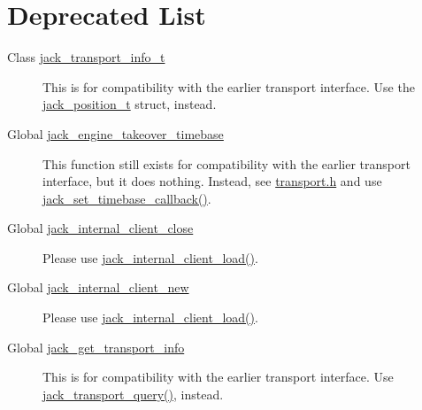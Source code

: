 \hypertarget{deprecated}{}\section{Deprecated List}\label{deprecated}
\label{deprecated__deprecated000004}
\hypertarget{deprecated__deprecated000004}{}
 \begin{description}
\item[Class \hyperlink{structjack__transport__info__t}{jack\_\-transport\_\-info\_\-t} ]This is for compatibility with the earlier transport interface. Use the \hyperlink{structjack__position__t}{jack\_\-position\_\-t} struct, instead. \end{description}


\label{deprecated__deprecated000003}
\hypertarget{deprecated__deprecated000003}{}
 \begin{description}
\item[Global \hyperlink{jack_8h_fe90d892429267872e213823cbed0d84}{jack\_\-engine\_\-takeover\_\-timebase} ]This function still exists for compatibility with the earlier transport interface, but it does nothing. Instead, see \hyperlink{transport_8h}{transport.h} and use \hyperlink{transport_8h_d1d237a74417e8b4a4bc7894afefc1cb}{jack\_\-set\_\-timebase\_\-callback()}.

\end{description}


\label{deprecated__deprecated000002}
\hypertarget{deprecated__deprecated000002}{}
 \begin{description}
\item[Global \hyperlink{jack_8h_013232493892e3a0eaf5f2498388118c}{jack\_\-internal\_\-client\_\-close} ]Please use \hyperlink{intclient_8h_03ffbdaae16521490f39230acbaf65c0}{jack\_\-internal\_\-client\_\-load()}. \end{description}


\label{deprecated__deprecated000001}
\hypertarget{deprecated__deprecated000001}{}
 \begin{description}
\item[Global \hyperlink{jack_8h_1baf4fbdc7de21679a2f26931cba2e86}{jack\_\-internal\_\-client\_\-new} ]Please use \hyperlink{intclient_8h_03ffbdaae16521490f39230acbaf65c0}{jack\_\-internal\_\-client\_\-load()}.

\end{description}


\label{deprecated__deprecated000005}
\hypertarget{deprecated__deprecated000005}{}
 \begin{description}
\item[Global \hyperlink{transport_8h_84542d303215c8dcfec80f2f7700c255}{jack\_\-get\_\-transport\_\-info} ]This is for compatibility with the earlier transport interface. Use \hyperlink{transport_8h_376e441203bc73d3c99c6e31ca193638}{jack\_\-transport\_\-query()}, instead.

\end{description}


